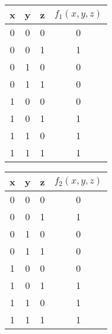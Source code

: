 \documentclass[svgnames,11pt]{beamer}
\begin{document}
\begin{frame}
    \frametitle{}

    \begin{multicols}{2}
        \begin{center}
            \begin{tabular}{|*4{c|}}
                \hline
                x & y & z & $f_1(x,y,z)$ \\
                \hline
                0 & 0 & 0 & 0            \\
                \hline
                0 & 0 & 1 & 1            \\
                \hline
                0 & 1 & 0 & 0            \\
                \hline
                0 & 1 & 1 & 0            \\
                \hline
                1 & 0 & 0 & 0            \\
                \hline
                1 & 0 & 1 & 1            \\
                \hline
                1 & 1 & 0 & 1            \\
                \hline
                1 & 1 & 1 & 1            \\
                \hline
            \end{tabular}
        \end{center}
        \begin{center}
            \begin{tabular}{|*4{c|}}
                \hline
                x & y & z & $f_2(x,y,z)$ \\
                \hline
                0 & 0 & 0 & 0            \\
                \hline
                0 & 0 & 1 & 1            \\
                \hline
                0 & 1 & 0 & 0            \\
                \hline
                0 & 1 & 1 & 0            \\
                \hline
                1 & 0 & 0 & 0            \\
                \hline
                1 & 0 & 1 & 1            \\
                \hline
                1 & 1 & 0 & 1            \\
                \hline
                1 & 1 & 1 & 1            \\
                \hline
            \end{tabular}
        \end{center}
    \end{multicols}

\end{frame}
\end{document}
